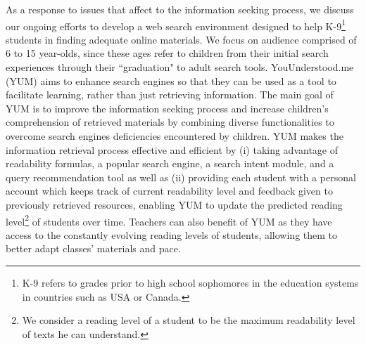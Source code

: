 \documentclass{sig-alternate-05-2015}
\begin{document}
As a response to issues that affect to the information seeking process,  we discuss our ongoing efforts to develop a web search environment designed to help K-9\footnote{ K-9 refers to grades prior to high school sophomores in the education systems in countries such as USA or Canada.} students in finding adequate online materials. We focus on audience comprised of 6 to 15 year-olds, since these ages refer to children from their initial search experiences through their ``graduation" to adult search tools. YouUnderstood.me (YUM) aims to enhance search engines so that they can be used as a tool to facilitate learning, rather than just retrieving information. The main goal of YUM is to improve the information seeking process and increase children's comprehension of retrieved materials by combining diverse functionalities to overcome search engines deficiencies encountered by children. YUM makes the information retrieval process effective and efficient by (i) taking advantage of readability formulas, a popular search engine, a search intent module, and a query recommendation tool as well as (ii) providing each student with a personal account which keeps track of current readability level and feedback given to previously retrieved resources, enabling YUM to update the predicted reading  level\footnote{We consider a reading level of a student to be the maximum readability level of texts he can understand.} of students over time.  Teachers can also benefit of YUM  as they have access to the constantly evolving reading levels of students, allowing them to better adapt classes' materials and pace. 
\end{document}
